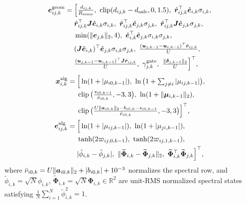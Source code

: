\begin{equation}
\begin{split}
 \boldsymbol e_{ij,k}^{\mathrm{geom}}&=\Big[\tfrac{d_{ij,k}}{R_{\mathrm{sense}}},\ \clip(d_{ij,k}-\ds,0,1.5),\ \hat{\br}_{ij,k}^{\top}\hat{\be}_{i,k}\sigma_{i,k},\\
 &\quad\ \hat{\br}_{ij,k}^{\top}\bJ\hat{\be}_{i,k}\sigma_{i,k},\ \hat{\br}_{ij,k}^{\top}\hat{\be}_{j,k}\sigma_{j,k},\ \hat{\br}_{ij,k}^{\top}\bJ\hat{\be}_{j,k}\sigma_{j,k},\\
 &\quad\ \min(\norm{\be_{j,k}}_2,4),\ \hat{\be}_{i,k}^{\top}\hat{\be}_{j,k}\sigma_{i,k}\sigma_{j,k},\\
 &\quad\ (\bJ\hat{\be}_{i,k})^{\top}\hat{\be}_{j,k}\sigma_{i,k}\sigma_{j,k},\ \tfrac{(\bu_{j,k-1}-\bu_{i,k-1})^{\top}\hat{\br}_{ij,k}}{U},\\
 &\quad\ \tfrac{(\bu_{j,k-1}-\bu_{i,k-1})^{\top}\bJ\hat{\br}_{ij,k}}{U},\ \gamma_{j,k}^{\mathrm{gate}},\ \tfrac{\norm{\boldsymbol\delta_{j,k-1}}_2}{U}\Big]^{\top},
\end{split}\label{eq:edge-geom}
\end{equation}
\begin{equation}
\begin{split}
 \boldsymbol x_{i,k}^{\mathrm{alg}}&=\Big[\ln(1+|\mu_{i0,k-1}|),\ \ln\big(1+\textstyle\sum_{j\ne i}|\mu_{ij,k-1}|\big),\\
 &\quad\ \clip\big(\tfrac{s_{i0,k-1}}{\bar\nu_{i0,k}},-3,3\big),\ \ln(1+\norm{\boldsymbol\mu_{i,k-1}}_2),\\
 &\quad\ \clip\big(\tfrac{U\norm{\boldsymbol a_{i0,k}}_2-b_{i0,k}-s_{i0,k-1}}{\bar\nu_{i0,k}},-3,3\big)\Big]^{\top},\\
 \boldsymbol e_{ij,k}^{\mathrm{alg}}&=\Big[\ln(1+|\mu_{ij,k-1}|),\ \ln(1+|\mu_{ji,k-1}|),\\
 &\quad\ \tanh(2\varpi_{ij,0,k-1}),\ \tanh(2\varpi_{ij,1,k-1}),\\
 &\quad\ |\tilde\phi_{i,k}-\tilde\phi_{j,k}|,\ \norm{\widetilde{\boldsymbol\Phi}_{i,k}-\widetilde{\boldsymbol\Phi}_{j,k}}_2,\ \widetilde{\boldsymbol\Phi}_{i,k}^{\top}\widetilde{\boldsymbol\Phi}_{j,k}\Big]^{\top},
\end{split}\label{eq:alg-feat}
\end{equation}
where $\bar\nu_{i0,k}=U\lVert\boldsymbol a_{i0,k}\rVert_2+|b_{i0,k}|+10^{-3}$ normalizes the spectral row, and $\tilde\phi_{i,k}=\sqrt{N}\phi_{i,k}$, $\widetilde{\boldsymbol\Phi}_{i,k}=\sqrt{N}\boldsymbol\Phi_{i,k}\in\mathbb R^2$ are unit-RMS normalized spectral states satisfying $\frac1N\sum_{i=1}^N\tilde\phi_{i,k}^2=1$.

